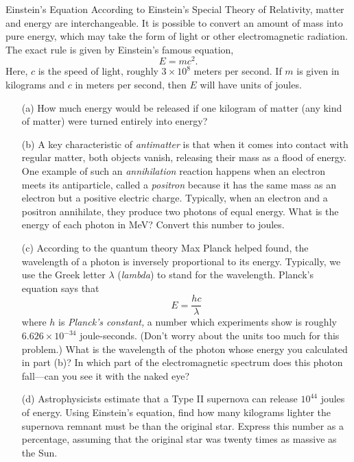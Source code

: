 \documentclass[12pt]{article}
\begin{document}
\begin{probdesc}{6}{Einstein's Equation}
According to Einstein's Special Theory of Relativity, matter and
energy are interchangeable.  It is possible to convert an amount of
mass into pure energy, which may take the form of light or other
electromagnetic radiation.  The exact rule is given by Einstein's
famous equation,
\begin{equation}
E = mc^2.
\end{equation}
Here, $c$ is the speed of light, roughly $3\times10^8$ meters per
second.  If $m$ is given in kilograms and $c$ in meters per second,
then $E$ will have units of joules.
\begin{enumerate}
\item[(a)] How much energy would be released if one kilogram of matter (any
  kind of matter) were turned entirely into energy?

\item[(b)] A key characteristic of {\em antimatter} is that when it comes
  into contact with regular matter, both objects vanish, releasing
  their mass as a flood of energy.  One example of such an {\em
  annihilation} reaction happens when an electron meets its
  antiparticle, called a {\em positron} because it has the same mass
  as an electron but a positive electric charge.  Typically, when an
  electron and a positron annihilate, they produce two photons of
  equal energy.  What is the energy of each photon in MeV?  Convert
  this number to joules.

\item[(c)] According to the quantum theory Max Planck helped found,
  the wavelength of a photon is inversely proportional to its energy.
  Typically, we use the Greek letter $\lambda$ ({\em lambda}) to stand
  for the wavelength.  Planck's equation says that
  \begin{equation}
    E = \frac{hc}{\lambda}
  \end{equation}
  where $h$ is {\em Planck's constant,} a number which experiments
  show is roughly $6.626\times10^{-34}$ joule-seconds.  (Don't worry
  about the units too much for this problem.)  What is the wavelength
  of the photon whose energy you calculated in part (b)?  In which
  part of the electromagnetic spectrum does this photon fall---can you
  see it with the naked eye?

\item[(d)] Astrophysicists estimate that a Type II supernova can
  release $10^{44}$ joules of energy.  Using Einstein's equation, find
  how many kilograms lighter the supernova remnant must be than the
  original star.  Express this number as a percentage, assuming that
  the original star was twenty times as massive as the Sun.
\end{enumerate}
\end{probdesc}
\end{document}
